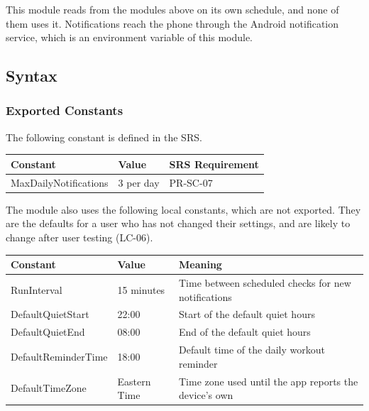 \documentclass[12pt, titlepage]{article}
\begin{document}
\noindent This module reads from the modules above on its own schedule, and
none of them uses it. Notifications reach the phone through the Android
notification service, which is an environment variable of this module.

\subsection{Syntax}

\subsubsection{Exported Constants}

The following constant is defined in the SRS.

\begin{center}
\renewcommand{\arraystretch}{1.2}
\begin{tabular}{l l l}
\toprule
\textbf{Constant} & \textbf{Value} & \textbf{SRS Requirement}\\
\midrule
\textsf{MaxDailyNotifications} & 3 per day & PR-SC-07\\
\bottomrule
\end{tabular}
\end{center}

\noindent The module also uses the following local constants, which are not
exported. They are the defaults for a user who has not changed their
settings, and are likely to change after user testing (LC-06).

\begin{center}
\renewcommand{\arraystretch}{1.2}
\begin{tabular}{l l >{\raggedright\arraybackslash}p{7cm}}
\toprule
\textbf{Constant} & \textbf{Value} & \textbf{Meaning}\\
\midrule
\textsf{RunInterval} & 15 minutes & Time between scheduled checks for new
  notifications\\
\textsf{DefaultQuietStart} & 22:00 & Start of the default quiet hours\\
\textsf{DefaultQuietEnd} & 08:00 & End of the default quiet hours\\
\textsf{DefaultReminderTime} & 18:00 & Default time of the daily workout
  reminder\\
\textsf{DefaultTimeZone} & Eastern Time & Time zone used until the app
  reports the device's own\\
\bottomrule
\end{tabular}
\end{center}
\end{document}
